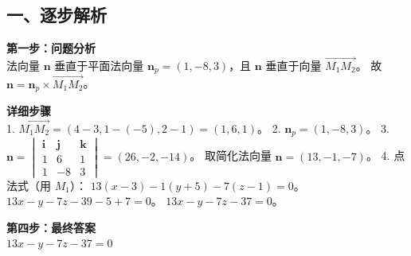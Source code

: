 \documentclass[12pt, a4paper]{ctexart}
\newenvironment{RedAnalysis}{
    \par
    \color{red} %
}{
    \par
    \color{black} %
}
\begin{document}
\begin{RedAnalysis}

\subsection*{一、逐步解析}

\textbf{第一步：问题分析} \\
法向量 $\mathbf{n}$ 垂直于平面法向量 $\mathbf{n}_p=(1,-8,3)$，且 $\mathbf{n}$ 垂直于向量 $\overrightarrow{M_1M_2}$。
故 $\mathbf{n} = \mathbf{n}_p \times \overrightarrow{M_1M_2}$。

\textbf{详细步骤} \\
1. $\overrightarrow{M_1M_2} = (4-3, 1-(-5), 2-1) = (1, 6, 1)$。
2. $\mathbf{n}_p = (1, -8, 3)$。
3. $\mathbf{n} = \begin{vmatrix} \mathbf{i} & \mathbf{j} & \mathbf{k} \\ 1 & 6 & 1 \\ 1 & -8 & 3 \end{vmatrix} = (26, -2, -14)$。
   取简化法向量 $\mathbf{n} = (13, -1, -7)$。
4. 点法式（用 $M_1$）：
   $13(x-3) - 1(y+5) - 7(z-1) = 0$。
   $13x - y - 7z - 39 - 5 + 7 = 0$。
   $13x - y - 7z - 37 = 0$。

\textbf{第四步：最终答案} \\
$ 13x - y - 7z - 37 = 0 $

\end{RedAnalysis}
\end{document}
